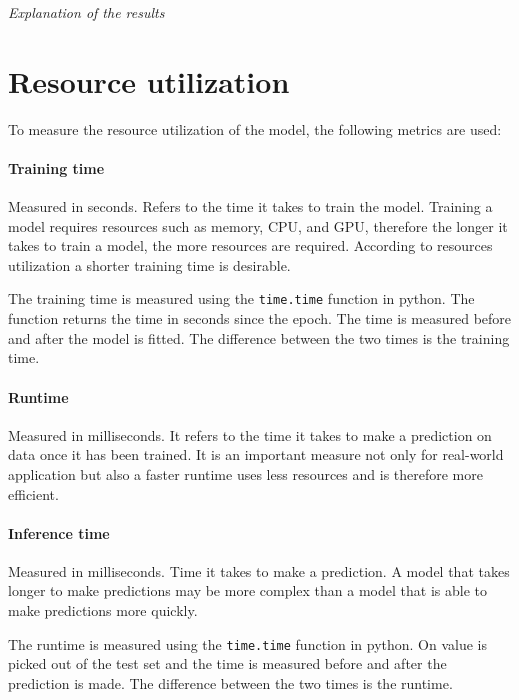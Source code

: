 \textit{Explanation of the results}


\section{Resource utilization}

To measure the resource utilization of the model, the following metrics are used:

\paragraph*{Training time}
Measured in seconds. Refers to the time it takes to train the model.
Training a model requires resources such as memory, CPU, and GPU, therefore the longer it takes
to train a model, the more resources are required. According to resources utilization a shorter
training time is desirable.

The training time is measured using the \texttt{time.time} function in python. The function
returns the time in seconds since the epoch. The time is measured before and after the model is
fitted. The difference between the two times is the training time.

\paragraph*{Runtime}
Measured in milliseconds. It refers to the time it takes to make a prediction on data once it has
been trained.
It is an important measure not only for real-world application but also a faster runtime uses
less resources and is therefore more efficient.


\paragraph*{Inference time}
Measured in milliseconds. Time it takes to make a prediction.
A model that takes longer to make predictions may be more complex than a model that is able to
make predictions more quickly.


The runtime is measured using the \texttt{time.time}  function in python. On value is picked out
of the test set and the time is measured before and after the prediction is made. The difference
between the two times is the runtime.

